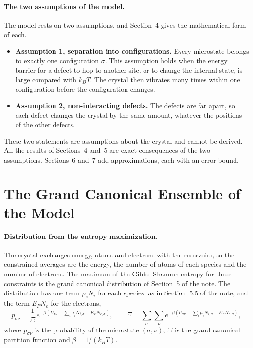 \documentclass[11pt]{article}      %
\numberwithin{equation}{section}   %
\begin{document}
\paragraph{The two assumptions of the model.}
The model rests on two assumptions, and Section~4 gives the mathematical
form of each.
\begin{itemize}
    \item \textbf{Assumption 1, separation into configurations.} Every
    microstate belongs to exactly one configuration $\sigma$. This
    assumption holds when the energy barrier for a defect to hop to another
    site, or to change the internal state, is large compared with $k_BT$.
    The crystal then vibrates many times within one configuration before the
    configuration changes.
    \item \textbf{Assumption 2, non-interacting defects.} The defects are
    far apart, so each defect changes the crystal by the same amount,
    whatever the positions of the other defects.
\end{itemize}
These two statements are assumptions about the crystal and cannot be
derived. All the results of Sections~4 and~5 are exact consequences of the
two assumptions. Sections~6 and~7 add approximations, each with an error
bound.

\section{The Grand Canonical Ensemble of the Model}

\paragraph{Distribution from the entropy maximization.}
The crystal exchanges energy, atoms and electrons with the reservoirs, so
the constrained averages are the energy, the number of atoms of each
species and the number of electrons. The maximum of the Gibbs--Shannon
entropy for these constraints is the grand canonical distribution of
Section~5 of the note. The distribution has one term $\mu_iN_i$ for each
species, as in Section~5.5 of the note, and the term $E_FN_e$ for the
electrons,
\begin{equation}
    \boxed{p_{\sigma\nu}=\frac{1}{\Xi}\,
    e^{-\beta\left(U_{\sigma\nu}-\sum_i\mu_iN_{i,\sigma}-E_FN_{e,\sigma}\right)},
    \qquad
    \Xi=\sum_{\sigma}\sum_{\nu}
    e^{-\beta\left(U_{\sigma\nu}-\sum_i\mu_iN_{i,\sigma}-E_FN_{e,\sigma}\right)},}
    \label{eq:ensemble}
\end{equation}
where $p_{\sigma\nu}$ is the probability of the microstate $(\sigma,\nu)$,
$\Xi$ is the grand canonical partition function and $\beta=1/(k_BT)$.
\end{document}

